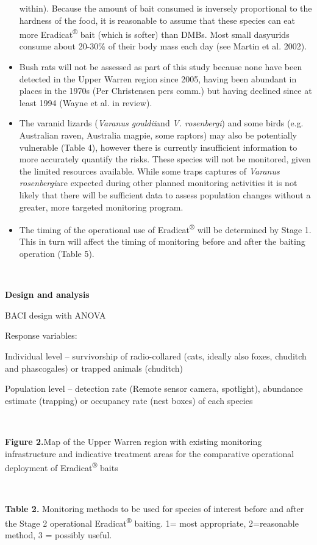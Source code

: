 \documentclass[version=last,
    paper=a4,                               %
    10pt,                                   %
    dvipsnames,
    oneside,                              %
    headings=openany,                       %
    open=any,
    BCOR=7mm,                               %
    DIV=15,     %
]{scrbook}
\begin{document}
\begin{itemize}
  within). Because the amount of bait consumed is inversely proportional
  to the hardness of the food, it is reasonable to assume that these
  species can eat more Eradicat\textsuperscript{®} bait (which is
  softer) than DMBs. Most small dasyurids consume about 20-30\% of their
  body mass each day (see Martin et al. 2002).
\item
  Bush rats will not be assessed as part of this study because none have
  been detected in the Upper Warren region since 2005, having been
  abundant in places in the 1970s (Per Christensen pers comm.) but
  having declined since at least 1994 (Wayne et al. in review).
\item
  The varanid lizards (\emph{Varanus gouldii}and \emph{V. rosenbergi})
  and some birds (e.g. Australian raven, Australia magpie, some raptors)
  may also be potentially vulnerable (Table 4), however there is
  currently insufficient information to more accurately quantify the
  risks. These species will not be monitored, given the limited
  resources available. While some traps captures of \emph{Varanus
  rosenbergi}are expected during other planned monitoring activities it
  is not likely that there will be sufficient data to assess population
  changes without a greater, more targeted monitoring program.
\item
  The timing of the operational use of Eradicat\textsuperscript{®} will
  be determined by Stage 1. This in turn will affect the timing of
  monitoring before and after the baiting operation (Table 5).
\end{itemize}

~

\textbf{Design and analysis}

BACI design with ANOVA

Response variables:

Individual level -- survivorship of radio-collared (cats, ideally also
foxes, chuditch and phascogales) or trapped animals (chuditch)

Population level -- detection rate (Remote sensor camera, spotlight),
abundance estimate (trapping) or occupancy rate (nest boxes) of each
species

~~

\textbf{Figure 2.}Map of the Upper Warren region with existing
monitoring infrastructure and indicative treatment areas for the
comparative operational deployment of Eradicat\textsuperscript{®} baits

~

\textbf{Table 2.} Monitoring methods to be used for species of interest
before and after the Stage 2 operational Eradicat\textsuperscript{®}
baiting. 1= most appropriate, 2=reasonable method, 3 = possibly useful.
\end{document}
